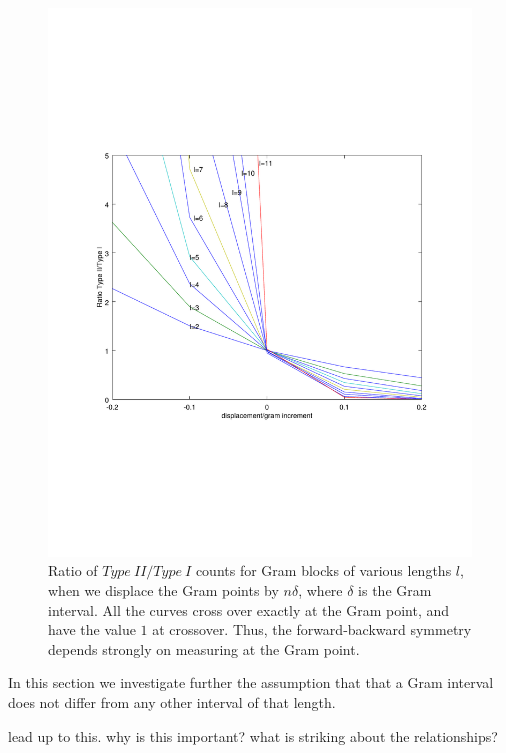 \documentclass[twoside]{article}
\theoremstyle{definition}
\begin{document}
\begin{figure}
\centering
\includegraphics[width=1.1\textwidth]{typeIIratio}
\caption[]{ 
  Ratio of $Type~II/Type~I$ counts for Gram blocks of various lengths $l$, when we displace the Gram points by $n\delta$, where $\delta$ is the Gram interval. All the curves cross over exactly at the Gram point, and have the value $1$ at crossover. Thus, the forward-backward symmetry depends strongly on measuring at the Gram point.
 }
\vspace{1mm}
\label{typeIIratio}
\end{figure}


In this section we investigate further the assumption that that a Gram interval does not differ from any other interval of that length. 

lead up to this. why is this important? what is striking about the relationships?
\end{document}
